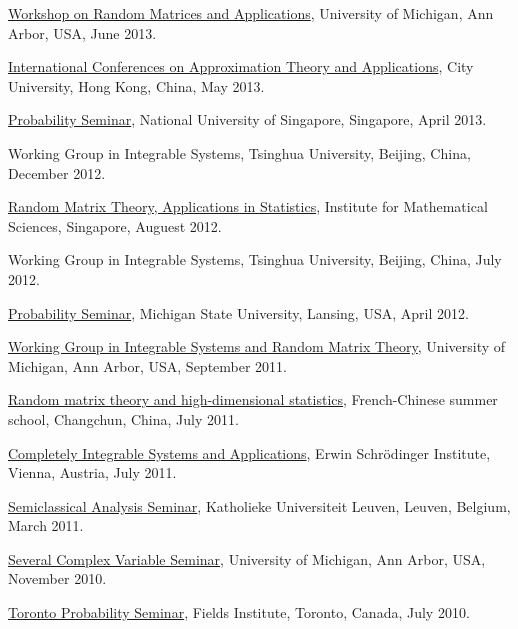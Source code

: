 \begin{item_list}
\item
  \href{http://web.eecs.umich.edu/~rajnrao/rmt2013/}{Workshop on Random Matrices and Applications}, University of Michigan, Ann Arbor, USA, June 2013.
\item
  \href{http://www6.cityu.edu.hk/ma/maicata/}{International Conferences on Approximation Theory and Applications}, City University, Hong Kong, China, May 2013.
\item
  \href{http://www.math.nus.edu.sg/seminars.aspx?CatID=9}{Probability Seminar}, National University of Singapore, Singapore, April 2013.
\item
  Working Group in Integrable Systems, Tsinghua University, Beijing, China, December 2012.
\item
  \href{http://www2.ims.nus.edu.sg/Programs/012random/wk2.php}{Random Matrix Theory, Applications in Statistics}, Institute for Mathematical Sciences, Singapore, Auguest 2012.
\item
  Working Group in Integrable Systems, Tsinghua University, Beijing, China, July 2012.
\item
  \href{http://mathdata.msu.edu/Seminar/Recent.asp?s=928}{Probability Seminar}, Michigan State University, Lansing, USA, April 2012.
\item
  \href{http://www.math.lsa.umich.edu/seminars_events/events.php?eventdefid=43&dt_begin=2011-07-01&dt_end=2011-12-31}{Working Group in Integrable Systems and Random Matrix Theory}, University of Michigan, Ann Arbor, USA, September 2011.
\item
  \href{http://web.hku.hk/~jeffyao/ss/}{Random matrix theory and high-dimensional statistics},  French-Chinese summer school, Changchun, China, July 2011.
\item
  \href{http://www.esf.org/activities/esf-conferences/details/2011/confdetail369.html}{Completely Integrable Systems and Applications}, Erwin Schr\"{o}dinger Institute, Vienna, Austria, July 2011.
\item
  \href{http://wis.kuleuven.be/analyse/seminar-classical.html}{Semiclassical Analysis Seminar}, Katholieke Universiteit Leuven, Leuven, Belgium, March 2011.
\item
  \href{http://www.math.lsa.umich.edu/seminars/scv/}{Several Complex Variable Seminar}, University of Michigan, Ann Arbor, USA, November 2010.
\item
  \href{http://www.math.utoronto.ca/cms/toronto-probability-seminar/}{Toronto Probability Seminar}, Fields Institute, Toronto, Canada, July 2010.
\item

\end{item_list}
